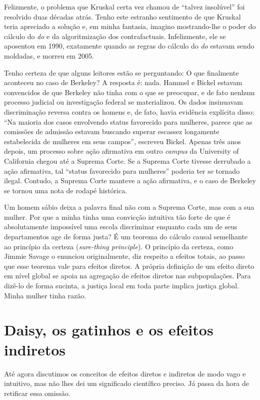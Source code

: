 \documentclass[11pt,a5paper,twoside]{book}
\begin{document}
Felizmente, o problema que Kruskal certa vez chamou de “talvez insolúvel” foi resolvido duas décadas atrás. Tenho este estranho sentimento de que Kruskal teria apreciado a solução e, em minha fantasia, imagino mostrando-lhe o poder do cálculo do \textit{do} e da algoritmização dos contrafactuais. Infelizmente, ele se aposentou em 1990, exatamente quando as regras do cálculo do \textit{do} estavam sendo moldadas, e morreu em 2005.

Tenho certeza de que alguns leitores estão se perguntando: O que finalmente aconteceu no caso de Berkeley? A resposta é: nada. Hammel e Bickel estavam convencidos de que Berkeley não tinha com o que se preocupar, e de fato nenhum processo judicial ou investigação federal se materializou. Os dados insinuavam discriminação reversa contra os homens e, de fato, havia evidência explícita disso: “Na maioria dos casos envolvendo status favorecido para mulheres, parece que as comissões de admissão estavam buscando superar escassez longamente estabelecida de mulheres em seus campos”, escreveu Bickel. Apenas três anos depois, um processo sobre ação afirmativa em outro \textit{campus} da University of California chegou até a Suprema Corte. Se a Suprema Corte tivesse derrubado a ação afirmativa, tal “status favorecido para mulheres” poderia ter se tornado ilegal. Contudo, a Suprema Corte manteve a ação afirmativa, e o caso de Berkeley se tornou uma nota de rodapé histórica.

Um homem sábio deixa a palavra final não com a Suprema Corte, mas com a sua mulher. Por que a minha tinha uma convicção intuitiva tão forte de que é absolutamente impossível uma escola discriminar enquanto cada um de seus departamentos age de forma justa? É um teorema do cálculo causal semelhante ao princípio da certeza (\textit{sure-thing principle}). O princípio da certeza, como Jimmie Savage o enunciou originalmente, diz respeito a efeitos totais, ao passo que esse teorema vale para efeitos diretos. A própria definição de um efeito direto em nível global se apoia na agregação de efeitos diretos nas subpopulações. Para dizê-lo de forma sucinta, a justiça local em toda parte implica justiça global. Minha mulher tinha razão.

\section{Daisy, os gatinhos e os efeitos indiretos}
Até agora discutimos os conceitos de efeitos diretos e indiretos de modo vago e intuitivo, mas não lhes dei um significado científico preciso. Já passa da hora de retificar essa omissão.
\end{document}

